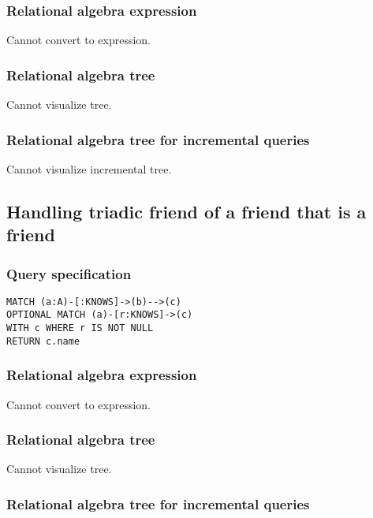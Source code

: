 \subsubsection*{Relational algebra expression}

Cannot convert to expression.

\subsubsection*{Relational algebra tree}

Cannot visualize tree.

\subsubsection*{Relational algebra tree for incremental queries}

Cannot visualize incremental tree.

\subsection{Handling triadic friend of a friend that is a friend}

\subsubsection*{Query specification}

\begin{lstlisting}
MATCH (a:A)-[:KNOWS]->(b)-->(c)
OPTIONAL MATCH (a)-[r:KNOWS]->(c)
WITH c WHERE r IS NOT NULL
RETURN c.name
\end{lstlisting}

\subsubsection*{Relational algebra expression}

Cannot convert to expression.

\subsubsection*{Relational algebra tree}

Cannot visualize tree.

\subsubsection*{Relational algebra tree for incremental queries}

